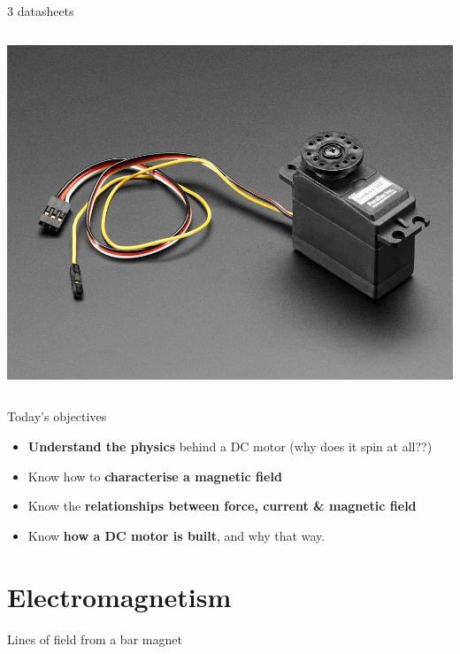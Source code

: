 \documentclass[compress]{beamer}
\makeatletter
\let\beamer@writeslidentry@miniframeson=\beamer@writeslidentry
\def\beamer@writeslidentry@miniframesoff{%
  \expandafter\beamer@ifempty\expandafter{\beamer@framestartpage}{}%
  {%
    \clearpage\beamer@notesactions%
  }
}
\newcommand*{\miniframeson}{\let\beamer@writeslidentry=\beamer@writeslidentry@miniframeson}
\newcommand*{\miniframesoff}{\let\beamer@writeslidentry=\beamer@writeslidentry@miniframesoff}
\makeatother
\begin{document}
\begin{frame}{3 datasheets}
\begin{columns}
\begin{column}{0.5\linewidth}
\begin{center}
                \includegraphics[height=0.22\paperheight]{feedback360}
            \end{center}
        \end{column}
    \end{columns}
\end{frame}

\miniframesoff
\begin{frame}{Today's objectives}

    \begin{itemize}
        \item \textbf{Understand the physics} behind a DC motor (why does it spin at all??)
        \item Know how to \textbf{characterise a magnetic field}
        \item Know the \textbf{relationships between force, current \& magnetic
            field}
        \item Know \textbf{how a DC motor is built}, and why that way.
    \end{itemize}
\end{frame}
\miniframeson


\section{Electromagnetism}


{
    \begin{frame}{Lines of field from a bar magnet}
    \end{frame}
}
\end{document}
